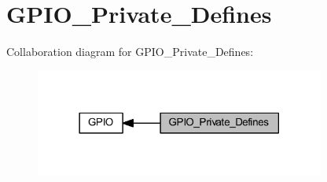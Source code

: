 \hypertarget{group___g_p_i_o___private___defines}{}\section{G\+P\+I\+O\+\_\+\+Private\+\_\+\+Defines}
\label{group___g_p_i_o___private___defines}
Collaboration diagram for G\+P\+I\+O\+\_\+\+Private\+\_\+\+Defines\+:
\nopagebreak
\begin{figure}[H]
\begin{center}
\leavevmode
\includegraphics[width=270pt]{group___g_p_i_o___private___defines}
\end{center}
\end{figure}
